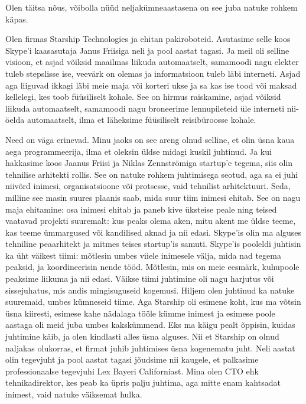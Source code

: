 Olen täitsa nõus, võibolla nüüd neljakümneaastasena on see juba 
natuke rohkem käpas. 


Olen firmas Starship Technologies ja ehitan 
pakiroboteid. Asutasime selle koos Skype'i kaasasutaja 
Janus Friisiga neli ja pool aastat 
tagasi. Ja meil oli selline 
visioon, et asjad võiksid maailmas liikuda automaatselt, samamoodi nagu 
elekter tuleb stepslisse ise, veevärk on olemas ja 
informatsioon tuleb läbi interneti. Asjad aga liiguvad ikkagi läbi meie maja 
või korteri ukse ja sa kas ise tood või maksad kellelegi, kes toob füüsiliselt 
kohale. See 
on hirmus raiskamine, asjad võiksid liikuda automaatselt, samamoodi nagu 
broneerime
lennupileteid üle interneti nii-öelda automaatselt, ilma et 
läheksime füüsiliselt reisibüroosse kohale.


Need on väga erinevad. Minu jaoks on see areng olnud selline, et 
olin üsna kaua aega programmeerija, ilma et oleksin 
üldse midagi kuskil juhtinud. Ja kui hakkasime koos Jaanus 
Friisi ja Niklas Zennströmiga startup'e tegema, 
siis olin 
tehnilise arhitekti rollis. See on
natuke rohkem juhtimisega seotud, aga sa ei juhi niivõrd inimesi, 
organisatsioone või protsesse, vaid tehnilist arhitektuuri. Seda,
milline see masin suures plaanis saab, mida suur 
tiim inimesi ehitab. See on nagu maja ehitamine: osa inimesi ehitab ja paneb 
kive üksteise peale ning teised vaatavad projekti 
suuremalt: kus peaks olema aken, mitu akent me üldse teeme, kas 
teeme ümmargused või kandilised aknad ja nii edasi. Skype'is olin ma alguses 
tehniline peaarhitekt ja 
mitmes teises startup'is samuti. Skype'is pooleldi juhtisin 
ka üht väikest tiimi: mõtlesin umbes viiele 
inimesele välja, mida nad tegema peaksid, ja koordineerisin nende tööd. 
Mõtlesin, mis on meie eesmärk, kuhupoole peaksime liikuma ja 
nii edasi. Väikse tiimi juhtimine oli nagu harjutus või sissejuhatus, mis andis 
mingisuguseid kogemusi. Hiljem olen juhtinud ka natuke suuremaid, umbes 
kümneseid tiime. Aga Starship oli esimene koht, kus 
ma võtsin üsna kiiresti, esimese kahe nädalaga tööle kümme inimest
ja esimese poole aastaga oli meid juba umbes kakskümmend. Eks ma käigu pealt 
õppisin, kuidas juhtimine käib, ja olen kindlasti alles
üsna alguses. Nii et Starship on olnud naljakas 
olukorras, et firmat juhib juhtimises üsna kogenematu juht. Neli aastat olin 
tegevjuht ja pool aastat tagasi jõudsime
nii kaugele, et palkasime professionaalse tegevjuhi Lex 
Bayeri Californiast. Mina olen CTO ehk 
tehnikadirektor, kes peab ka üpris palju juhtima, aga mitte enam kahtsadat 
inimest, vaid natuke väiksemat hulka.

